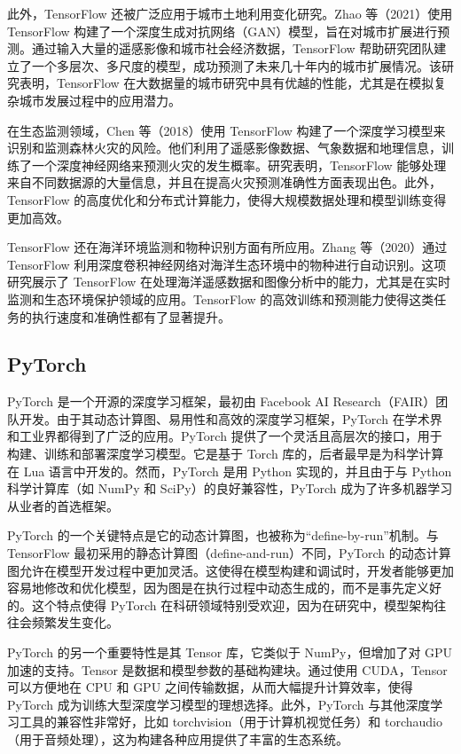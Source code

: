 \documentclass[AutoFakeBold]{LZUThesis-PgD&PhD}
\begin{document}
	此外，TensorFlow 还被广泛应用于城市土地利用变化研究。Zhao 等（2021）使用 TensorFlow 构建了一个深度生成对抗网络（GAN）模型，旨在对城市扩展进行预测\cite{zhao2021}。通过输入大量的遥感影像和城市社会经济数据，TensorFlow 帮助研究团队建立了一个多层次、多尺度的模型，成功预测了未来几十年内的城市扩展情况。该研究表明，TensorFlow 在大数据量的城市研究中具有优越的性能，尤其是在模拟复杂城市发展过程中的应用潜力。
	
	在生态监测领域，Chen 等（2018）使用 TensorFlow 构建了一个深度学习模型来识别和监测森林火灾的风险\cite{chen2018}。他们利用了遥感影像数据、气象数据和地理信息，训练了一个深度神经网络来预测火灾的发生概率。研究表明，TensorFlow 能够处理来自不同数据源的大量信息，并且在提高火灾预测准确性方面表现出色。此外，TensorFlow 的高度优化和分布式计算能力，使得大规模数据处理和模型训练变得更加高效。
	
	TensorFlow 还在海洋环境监测和物种识别方面有所应用。Zhang 等（2020）通过 TensorFlow 利用深度卷积神经网络对海洋生态环境中的物种进行自动识别\cite{zhang2020}。这项研究展示了 TensorFlow 在处理海洋遥感数据和图像分析中的能力，尤其是在实时监测和生态环境保护领域的应用。TensorFlow 的高效训练和预测能力使得这类任务的执行速度和准确性都有了显著提升。
	\subsection{PyTorch}
	
	PyTorch 是一个开源的深度学习框架，最初由 Facebook AI Research（FAIR）团队开发。由于其动态计算图、易用性和高效的深度学习框架，PyTorch 在学术界和工业界都得到了广泛的应用。PyTorch 提供了一个灵活且高层次的接口，用于构建、训练和部署深度学习模型。它是基于 Torch 库的，后者最早是为科学计算在 Lua 语言中开发的。然而，PyTorch 是用 Python 实现的，并且由于与 Python 科学计算库（如 NumPy 和 SciPy）的良好兼容性，PyTorch 成为了许多机器学习从业者的首选框架。
	
	PyTorch 的一个关键特点是它的动态计算图，也被称为“define-by-run”机制。与 TensorFlow 最初采用的静态计算图（define-and-run）不同，PyTorch 的动态计算图允许在模型开发过程中更加灵活。这使得在模型构建和调试时，开发者能够更加容易地修改和优化模型，因为图是在执行过程中动态生成的，而不是事先定义好的。这个特点使得 PyTorch 在科研领域特别受欢迎，因为在研究中，模型架构往往会频繁发生变化。
	
	PyTorch 的另一个重要特性是其 Tensor 库，它类似于 NumPy，但增加了对 GPU 加速的支持。Tensor 是数据和模型参数的基础构建块。通过使用 CUDA，Tensor 可以方便地在 CPU 和 GPU 之间传输数据，从而大幅提升计算效率，使得 PyTorch 成为训练大型深度学习模型的理想选择。此外，PyTorch 与其他深度学习工具的兼容性非常好，比如 torchvision（用于计算机视觉任务）和 torchaudio（用于音频处理），这为构建各种应用提供了丰富的生态系统。
	
\end{document}
